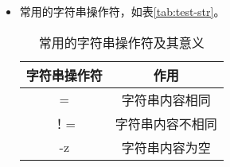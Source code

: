 \begin{enumerate}
\begin{enumerate}
\begin{itemize}
                \item 常用的字符串操作符，如表\ref{tab:test-str}。
                  \begin{table}[h]
                   \centering
                   \caption{常用的字符串操作符及其意义}
                     \begin{tabular*}{1\textwidth}{@{\extracolsep{\fill}}cc}
                     \toprule
                     字符串操作符     &作用              \\
                     \midrule
                       =            &字符串内容相同          \\
                     ！=            &字符串内容不相同      \\
                      -z            &字符串内容为空     \\


\end{tabular*}
\end{table}
\end{itemize}
\end{enumerate}
\end{enumerate}
